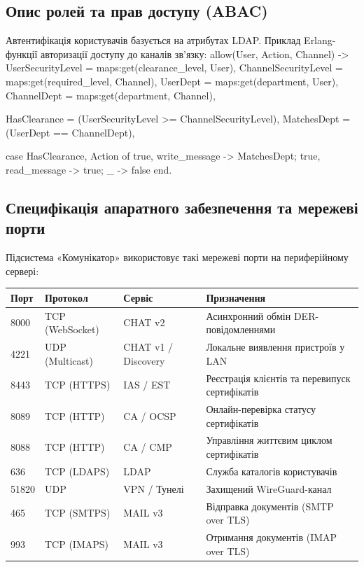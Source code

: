 \documentclass{article}
\let\originalfootnotesize\footnotesize
\let\oldverbatim\verbatim
\let\oldendverbatim\endverbatim
\renewenvironment{verbatim}{\originalfootnotesize\oldverbatim}{\oldendverbatim}
\begin{document}
\subsection{Опис ролей та прав доступу (ABAC)}
Автентифікація користувачів базується на атрибутах LDAP. Приклад Erlang-функції авторизації доступу до каналів зв'язку:
\begin{verbatim}
allow(User, Action, Channel) ->
    UserSecurityLevel = maps:get(clearance_level, User),
    ChannelSecurityLevel = maps:get(required_level, Channel),
    UserDept = maps:get(department, User),
    ChannelDept = maps:get(department, Channel),
    
    HasClearance = (UserSecurityLevel >= ChannelSecurityLevel),
    MatchesDept = (UserDept == ChannelDept),
    
    case {HasClearance, Action} of
        {true, write_message} -> MatchesDept;
        {true, read_message} -> true;
        _ -> false
    end.
\end{verbatim}

\subsection{Специфікація апаратного забезпечення та мережеві порти}
Підсистема «Комунікатор» використовує такі мережеві порти на периферійному сервері:
\begin{center}
\small
\begin{longtable}{p{2cm} p{3.5cm} p{2.5cm} p{5.5cm}}
\toprule
\textbf{Порт} & \textbf{Протокол} & \textbf{Сервіс} & \textbf{Призначення} \\
\midrule
8000 & TCP (WebSocket) & CHAT v2 & Асинхронний обмін DER-повідомленнями \\
4221 & UDP (Multicast) & CHAT v1 / Discovery & Локальне виявлення пристроїв у LAN \\
8443 & TCP (HTTPS) & IAS / EST & Реєстрація клієнтів та перевипуск сертифікатів \\
8089 & TCP (HTTP) & CA / OCSP & Онлайн-перевірка статусу сертифікатів \\
8088 & TCP (HTTP) & CA / CMP & Управління життєвим циклом сертифікатів \\
636 & TCP (LDAPS) & LDAP & Служба каталогів користувачів \\
51820 & UDP & VPN / Тунелі & Захищений WireGuard-канал \\
465 & TCP (SMTPS) & MAIL v3 & Відправка документів (SMTP over TLS) \\
993 & TCP (IMAPS) & MAIL v3 & Отримання документів (IMAP over TLS) \\
\bottomrule
\end{longtable}
\end{center}
\end{document}
